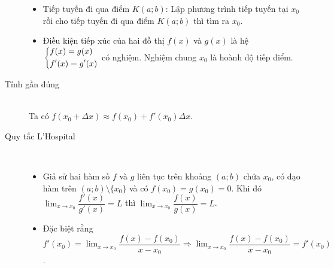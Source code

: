 \begin{description}
\begin{itemize}
{
	        }
	        \item Tiếp tuyến đi qua điểm $K(a;b)$: Lập phương trình tiếp tuyến tại $x_0$ rồi cho tiếp tuyến đi qua điểm $K(a;b)$ thì tìm ra $x_0$.
	        \item Điều kiện tiếp xúc của hai đồ thị $f(x)$ và $g(x)$ là hệ $\left\{\begin{aligned}&f(x)=g(x)\\&f'(x)=g'(x)\end{aligned}\right.$ có nghiệm. Nghiệm chung $x_0$ là hoành độ tiếp điểm.
	    \end{itemize}
	\item[Tính gần đúng]\ \\
	Ta có $f(x_0+\Delta x)\approx f(x_0)+f'(x_0)\Delta x$.
	\item[Quy tắc L'Hospital]\
    \begin{itemize}
        \item Giả sử hai hàm số $f$ và $g$ liên tục trên khoảng $(a;b)$ chứa $x_0$, có đạo hàm trên $(a;b)\setminus \{x_0\}$ và có $f(x_0)=g(x_0)=0$. Khi đó $\displaystyle\lim_{x\rightarrow x_0}\dfrac{f'(x)}{g'(x)}=L$ thì $\displaystyle\lim_{x\rightarrow x_0}\dfrac{f(x)}{g(x)}=L$.\\
	    \item Đặc biệt rằng $\displaystyle f'(x_0)=\lim_{x\rightarrow x_0}\dfrac{f(x)-f(x_0)}{x-x_0}\Rightarrow\lim_{x\rightarrow x_0}\dfrac{f(x)-f(x_0)}{x-x_0}=f'(x_0)$.
    \end{itemize}
\end{description}
